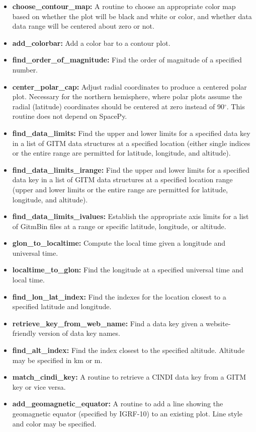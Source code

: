 \begin{itemize}
\item[]{{\bf choose\_contour\_map: } A routine to choose an appropriate color map based on whether the plot will be black and white or color, and whether data data range will be centered about zero or not.}
\item[]{{\bf add\_colorbar:}  Add a color bar to a contour plot.}
\item[]{{\bf find\_order\_of\_magnitude: } Find the order of magnitude of a specified number.}
\item[]{{\bf center\_polar\_cap:}  Adjust radial coordinates to produce a centered polar plot.  Necessary for the northern hemisphere, where polar plots assume the radial (latitude) coordinates should be centered at zero instead of 90$^\circ$.  This routine does not depend on SpacePy.}
\item[]{{\bf find\_data\_limits:}  Find the upper and lower limits for a specified data key in a list of GITM data structures at a specified location (either single indices or the entire range are permitted for latitude, longitude, and altitude).}
\item[]{{\bf find\_data\_limits\_irange:}  Find the upper and lower limits for a specified data key in a list of GITM data structures at a specified location range (upper and lower limits or the entire range are permitted for latitude, longitude, and altitude).}
\item[]{{\bf find\_data\_limits\_ivalues: } Establish the appropriate axis limits for a list of GitmBin files at a range or specific latitude, longitude, or altitude.}
\item[]{{\bf glon\_to\_localtime: } Compute the local time given a longitude and universal time.}
\item[]{{\bf localtime\_to\_glon:}  Find the longitude at a specified universal time and local time.}
\item[]{{\bf find\_lon\_lat\_index:}  Find the indexes for the location closest to a specified latitude and longitude.}
\item[]{{\bf retrieve\_key\_from\_web\_name:}  Find a data key given a website-friendly version of data key names.}
\item[]{{\bf find\_alt\_index:} Find the index closest to the specified altitude.  Altitude may be specified in km or m.}
\item[]{{\bf match\_cindi\_key: } A routine to retrieve a CINDI data key from a GITM key or vice versa.} 
\item[]{{\bf add\_geomagnetic\_equator: } A routine to add a line showing the geomagnetic equator (specified by IGRF-10) to an existing plot.  Line style and color may be specified.}

\end{itemize}
